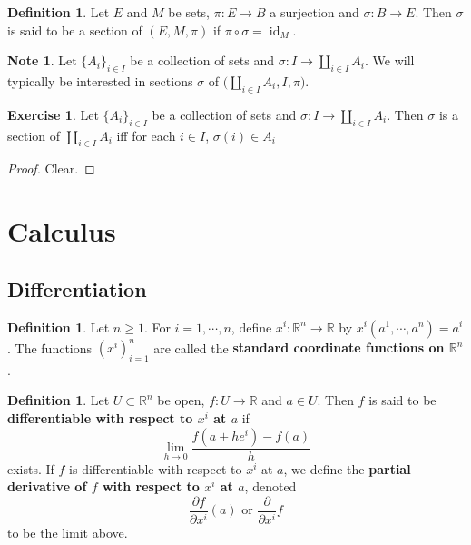 \documentclass{book}
\theoremstyle{definition}
\newtheorem{defn}[definition]{Definition}
\newtheorem{note}[definition]{Note}
\newtheorem{ex}[definition]{Exercise}
\newcommand{\sig}{\sigma}
\newcommand{\R}{\mathbb{R}}
\newcommand{\ld}[1]{\label{defn:#1}}
\DeclareMathOperator{\id}{id}
\DeclareMathOperator*{\0}{\mbf{0}}
\DeclareMathOperator*{\1}{\mbf{1}}
\newcommand{\p}{\partial}
\begin{document}
	\begin{defn}
		Let $E$ and $M$ be sets, $\pi:E \rightarrow B$ a surjection and $\sig: B \rightarrow E$. Then $\sig$ is said to be a section of $(E, M, \pi)$ if $\pi \circ \sig = \id_{M}$. 
	\end{defn}

	\begin{note}
		Let $\{A_i\}_{i \in I}$ be a collection of sets and $\sig: I \rightarrow \coprod\limits_{i \in I} A_i$. We will typically be interested in sections $\sig$ of $\bigg( \coprod\limits_{i \in I} A_i, I, \pi \bigg)$.
	\end{note}

	\begin{ex}
		Let $\{A_i\}_{i \in I}$ be a collection of sets and $\sig: I \rightarrow \coprod\limits_{i \in I} A_i$. Then $\sig$ is a section of $\coprod\limits_{i \in I} A_i$ iff for each $i \in I$, $\sig(i) \in A_i$
	\end{ex}
	
	\begin{proof}
		Clear.
	\end{proof}


















	
	\newpage
	\section{Calculus}
	
	\subsection{Differentiation}
	
	\begin{defn} \ld{21001}
		Let $n \geq 1$. For $i = 1, \cdots, n$, define $x^i: \R^n \rightarrow \R$ by $x^i(a^1, \cdots, a^n) = a^i$. The functions $(x^i)_{i=1}^n$ are called the \textbf{standard coordinate functions on $\R^n$}. 
	\end{defn}
	
	\begin{defn} \ld{21002}
		Let $U \subset \R^n$ be open, $f: U \rightarrow \R$ and $a \in U$. Then $f$ is said to be \textbf{differentiable with respect to $x^i$ at $a$} if $$\lim\limits_{h \rightarrow 0} \frac{f(a + he^i) - f(a)}{h}$$ exists. If $f$ is differentiable with respect to $x^i$ at $a$, we define the \textbf{partial derivative of $f$ with respect to $x^i$ at $a$}, denoted $$\frac{\p f}{\p x^i} (a) \text{ or } \frac{\p}{\p x^i} f $$ to be the limit above.
		
	\end{defn}
		
\end{document}
